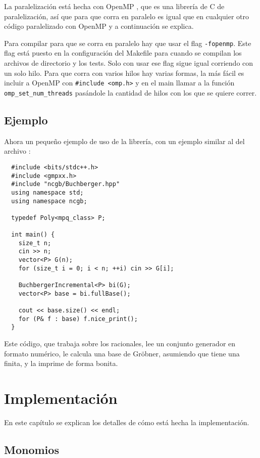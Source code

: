 \documentclass[12pt]{report}
\theoremstyle{customstyle}
\theoremstyle{factstyle}
\newcommand\cpp{C\nolinebreak[4]\hspace{-.05em}\raisebox{.4ex}{\relsize{-3}{\textbf{++}}}\xspace}
\begin{document}
La paralelización está hecha con OpenMP \cite{lib:openmp}, que es una librería de \cpp de paralelización, así que para que corra en paralelo es igual que en cualquier otro código paralelizado con OpenMP y a continuación se explica.

Para compilar para que se corra en paralelo hay que usar el flag \texttt{-fopenmp}. Este flag está puesto en la configuración del Makefile para cuando se compilan los archivos de directorio  y los tests. Solo con usar ese flag sigue igual corriendo con un solo hilo. Para que corra con varios hilos hay varias formas, la más fácil es incluir a OpenMP con \texttt{\#include <omp.h>} y en el main llamar a la función \texttt{omp\_set\_num\_threads} pasándole la cantidad de hilos con los que se quiere correr.


\section{Ejemplo}

Ahora un pequeño ejemplo de uso de la librería, con un ejemplo similar al del archivo :

\begin{verbatim}
  #include <bits/stdc++.h>
  #include <gmpxx.h>
  #include "ncgb/Buchberger.hpp"
  using namespace std;
  using namespace ncgb;

  typedef Poly<mpq_class> P;

  int main() {
    size_t n;
    cin >> n;
    vector<P> G(n);
    for (size_t i = 0; i < n; ++i) cin >> G[i];

    BuchbergerIncremental<P> bi(G);
    vector<P> base = bi.fullBase();

    cout << base.size() << endl;
    for (P& f : base) f.nice_print();
  }
\end{verbatim}

Este código, que trabaja sobre los racionales, lee un conjunto generador en formato numérico, le calcula una base de Gröbner, asumiendo que tiene una finita, y la imprime de forma bonita.


\chapter{Implementación}\label{cap:Implementación}

En este capítulo se explican los detalles de cómo está hecha la implementación.

\section{Monomios}
\end{document}
